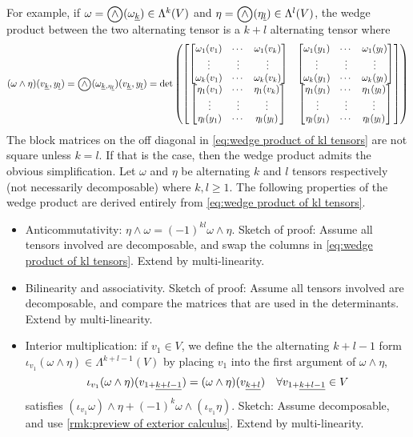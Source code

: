 \documentclass[../main-v2-manifolds.tex]{subfiles}
\begin{document}
For example, if $\omega=\bigowedge(\omega_{\underline{k}})\in \Lambda^k(V)$ and $\eta=\bigowedge(\eta_{\underline{l}})\in\Lambda^l(V)$, the wedge product between the two alternating tensor is a $k+l$ alternating tensor where
\begin{equation}
    (\omega\wedge\eta)(v_{\underline{k}}, y_{\underline{l}}) = \bigowedge(\omega_{\underline{k},\eta_{\underline{l}}})(v_{\underline{k}}, y_{\underline{l}})= \det\qty(
    \mqty[
        \mqty[
        \omega_1(v_1) & \cdots & \omega_1(v_k)  \\
        \vdots        & \vdots & \vdots         \\
        \omega_k(v_1) & \cdots & \omega_k(v_k)
        ] & 
        \mqty[
        \omega_1(y_1) & \cdots & \omega_1(y_l)  \\ 
        \vdots        & \vdots & \vdots         \\ 
        \omega_k(y_1) & \cdots & \omega_k(y_l)
        ] \\
        \mqty[
        \eta_1(v_1) & \cdots & \eta_1(v_k)      \\
        \vdots      & \vdots & \vdots           \\
        \eta_l(y_1) & \cdots & \eta_l(y_l)
        ] & 
        \mqty[
        \eta_1(y_1) & \cdots & \eta_1(y_l)      \\ 
        \vdots      & \vdots & \vdots           \\
        \eta_l(y_1) & \cdots & \eta_l(y_l)
        ]
    ]
    )
    \label{eq:wedge product of kl tensors}
\end{equation}
The block matrices on the off diagonal in \cref{eq:wedge product of kl tensors}  are not square unless $k=l$. If that is the case, then the wedge product admits the obvious simplification. Let $\omega$ and $\eta$ be alternating $k$ and $l$ tensors respectively (not necessarily decomposable) where $k,l\geq 1$. The following properties of the wedge product are derived entirely from \cref{eq:wedge product of kl tensors}. 
\begin{itemize}
    \item Anticommutativity: $\eta\wedge\omega = (-1)^{kl}\omega\wedge\eta$. Sketch of proof: Assume all tensors involved are decomposable, and swap the columns in \cref{eq:wedge product of kl tensors}. Extend by multi-linearity.
    \item Bilinearity and associativity. Sketch of proof: Assume all tensors involved are decomposable, and compare the matrices that are used in the determinants. Extend by multi-linearity.
    \item Interior multiplication: if $v_1\in V$, we define the the alternating $k+l-1$ form $\iota_{v_1}(\omega\wedge \eta)\in \Lambda^{k+l-1}(V)$ by placing $v_1$ into the first argument of $\omega\wedge\eta$,
    \[
        \iota_{v_1}(\omega\wedge\eta)(\UL{v}[1+][k+l-1]) = (\omega\wedge\eta)(\UL{v}[k+l])\quad\forall \UL{v}[1+][k+l-1]\in V
    \]
    satisfies $(\iota_{v_1}\omega)\wedge \eta + (-1)^{k} \omega\wedge(\iota_{v_1}\eta)$. Sketch: Assume decomposable, and use \cref{rmk:preview of exterior calculus}. Extend by multi-linearity.
\end{itemize}
\end{document}
